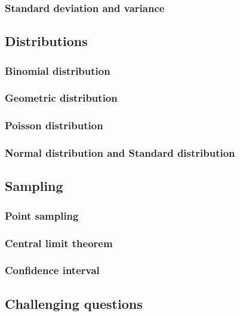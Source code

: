 \documentclass[12pt]{article}
\begin{document}
    \subsubsection*{Standard deviation and variance}

    \subsection{Distributions}

    \subsubsection*{Binomial distribution}

    \subsubsection*{Geometric distribution}

    \subsubsection*{Poisson distribution}

    \subsubsection*{Normal distribution and Standard distribution}

    \subsection{Sampling}

    \subsubsection*{Point sampling}

    \subsubsection*{Central limit theorem}

    \subsubsection*{Confidence interval}

    \subsection{Challenging questions}
\end{document}
